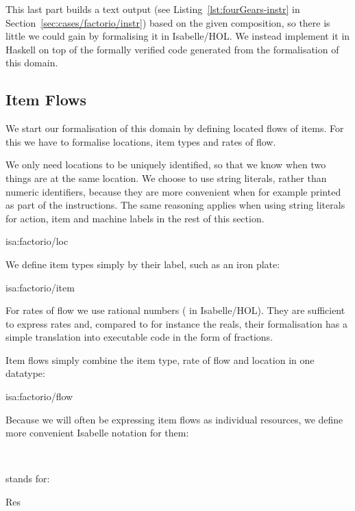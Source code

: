 \documentclass[class=smolathesis,crop=false]{standalone}
\begin{document}
This last part builds a text output (see Listing~\ref{lst:fourGears-instr} in Section~\ref{sec:cases/factorio/instr}) based on the given composition, so there is little we could gain by formalising it in Isabelle/HOL\@.
We instead implement it in Haskell on top of the formally verified code generated from the formalisation of this domain.

\subsection{Item Flows}
\label{sec:cases/factorio/item}

We start our formalisation of this domain by defining located flows of items.
For this we have to formalise locations, item types and rates of flow.

We only need locations to be uniquely identified, so that we know when two things are at the same location.
We choose to use string literals, rather than numeric identifiers, because they are more convenient when for example printed as part of the instructions.
The same reasoning applies when using string literals for action, item and machine labels in the rest of this section.
\begin{isadef}{isa:factorio/loc}
  
\end{isadef}

We define item types simply by their label, such as an iron plate:
\begin{isadef}{isa:factorio/item}
  
\item
  
\end{isadef}

For rates of flow we use rational numbers ( in Isabelle/HOL).
They are sufficient to express rates and, compared to for instance the reals, their formalisation has a simple translation into executable code in the form of fractions.

Item flows simply combine the item type, rate of flow and location in one datatype:
\begin{isadef}{isa:factorio/flow}
  
\end{isadef}

Because we will often be expressing item flows as individual resources, we define more convenient Isabelle notation for them:
\begin{isabelle}
\centering
  \ \ 
\end{isabelle}
stands for:
\begin{isabelle}
\centering
  Res\ 
\end{isabelle}
\end{document}
